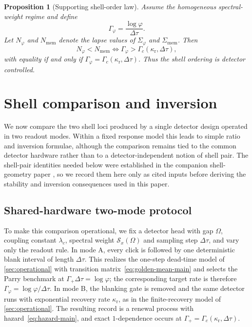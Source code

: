 \documentclass[11pt]{article}
\newtheorem{proposition}[theorem]{Proposition}
\theoremstyle{definition}
\begin{document}
\begin{proposition}[Supporting shell-order law]\label{prop:order-main}
Assume the homogeneous spectral-weight regime and define
\[
\Gamma_{\varphi}=\frac{\log\varphi}{\Delta\tau}.
\]
Let $N_{\varphi}$ and $N_{\mathrm{mem}}$ denote the lapse values of $\Sigma_{\varphi}$ and $\Sigma_{\mathrm{mem}}$. Then
\begin{equation}\label{eq:order-main}
N_{\varphi}<N_{\mathrm{mem}}
\iff
\Gamma_{\varphi}>\Gamma_c(\kappa_{\mathrm r},\Delta\tau),
\end{equation}
with equality if and only if $\Gamma_{\varphi}=\Gamma_c(\kappa_{\mathrm r},\Delta\tau)$. Thus the shell ordering is detector controlled.
\end{proposition}

\section{Shell comparison and inversion}\label{sec:inverse}

We now compare the two shell loci produced by a single detector design operated in two readout modes. Within a fixed response model this leads to simple ratio and inversion formulae, although the comparison remains tied to the common detector hardware rather than to a detector-independent notion of shell pair. The shell-pair identities needed below were established in the companion shell-geometry paper \cite{MaZhang2026ShellGeometry}, so we record them here only as cited inputs before deriving the stability and inversion consequences used in this paper.

\subsection{Shared-hardware two-mode protocol}\label{subsec:two-mode}
To make this comparison operational, we fix a detector head with gap $\Omega$, coupling constant $\lambda_c$, spectral weight $\mathcal S_x(\Omega)$ and sampling step $\Delta\tau$, and vary only the readout rule. In mode A, every click is followed by one deterministic blank interval of length $\Delta\tau$. This realizes the one-step dead-time model of \cref{sec:operational} with transition matrix~\eqref{eq:golden-mean-main} and selects the Parry benchmark at $\Gamma_+\Delta\tau=\log\varphi$; the corresponding target rate is therefore $\Gamma_\varphi=\log\varphi/\Delta\tau$. In mode B, the blanking gate is removed and the same detector runs with exponential recovery rate $\kappa_{\mathrm r}$, as in the finite-recovery model of \cref{sec:operational}. The resulting record is a renewal process with hazard~\eqref{eq:hazard-main}, and exact $1$-dependence occurs at $\Gamma_+=\Gamma_c(\kappa_{\mathrm r},\Delta\tau)$.
\end{document}
